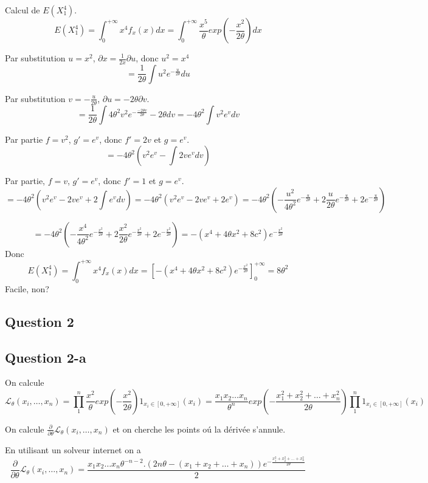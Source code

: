 \documentclass[]{book}
\theoremstyle{definition}
\begin{document}
Calcul de $E(X_1^4)$.
$$
E(X_1^4) = \int_{0}^{+\infty} x^4 f_{x}(x) dx = \int_{0}^{+\infty} \frac{x^5}{\theta} exp \left( -\frac{x^2}{2\theta}\right) dx 
$$

Par substitution $u=x^2$, $\partial x = \frac{1}{2x}\partial u$, donc $u^2 = x^4$
$$
= \frac{1}{2\theta} \int u^2e^{-\frac{u}{2\theta}}  du
$$

Par substitution $v = -\frac{u}{2\theta}$, $\partial u = -{2\theta} \partial v$.
$$
= \frac{1}{2\theta} \int 4\theta^2 v^2 e^{-\frac{-2\theta v}{2\theta}}  -{2\theta} dv = -4\theta^2 \int v^2 e^{v} dv
$$

Par partie $f=v^2$, $g'=e^v$, donc $f'=2v$ et $g=e^v$.
$$
= -4\theta^2 \left(v^2e^{v} - \int 2ve^v dv \right)
$$

Par partie, $f=v$, $g'=e^v$, donc $f'=1$ et $g=e^v$.
$$
= -4\theta^2 \left(v^2e^{v} - 2ve^v + 2\int e^v dv \right) 
= -4\theta^2 \left(v^2e^{v} - 2ve^v + 2e^v  \right) 
= -4\theta^2 \left(-\frac{u^2}{4\theta^2} e^{-\frac{u}{2\theta}} + 2 \frac{u}{2\theta} e^{-\frac{u}{2\theta}} + 2 e^{-\frac{u}{2\theta}} \right)
$$

$$
= -4\theta^2 \left(-\frac{x^4}{4\theta^2} e^{-\frac{x^2}{2\theta}} + 2 \frac{x^2}{2\theta} e^{-\frac{x^2}{2\theta}} + 2 e^{-\frac{x^2}{2\theta}} \right) = -(x^4 + 4\theta x^2 +8c^2) e^{-\frac{x^2}{2\theta}}
$$
Donc 
$$
E(X_1^4) = \int_{0}^{+\infty} x^4 f_{x}(x) dx = \left[ -(x^4 + 4\theta x^2 +8c^2) e^{-\frac{x^2}{2\theta}} \right]_{0}^{+\infty} = 8\theta^2
$$
Facile, non?



\subsection*{Question 2}
\subsection*{Question 2-a}
On calcule
$$
\mathcal{L}_{\theta}(x_i,\ldots,x_n) = 
\prod_{1}^{n}\frac{x^2}{\theta} exp \left( -\frac{x^2}{2\theta}\right) 1_{x_i \in [0,+\infty]}(x_i) =
\frac{x_1x_2 \ldots x_n}{\theta^n} exp \left( -\frac{x_1^2+x_2^2+ \ldots +x_n^2 }{2\theta} \right) \prod_{1}^{n}{1_{x_i \in [0,+\infty]}(x_i)}
$$

On calcule $\frac{\partial}{\partial \theta} \mathcal{L}_{\theta}(x_i,\ldots,x_n)$ et on cherche  les points o\'u la d\'eriv\'ee s'annule. 

En utilisant un solveur internet on a 
$$
\frac{\partial}{\partial \theta} \mathcal{L}_{\theta}(x_i,\ldots,x_n) = \frac{x_1 x_2 \ldots x_n \theta^{-n-2}.(2n\theta - (x_1+x_2+\ldots + x_n)) e^{-\frac{x_1^2+x_2^2+ \ldots + x_n^2}{2\theta}}} {2}
$$
\end{document}
